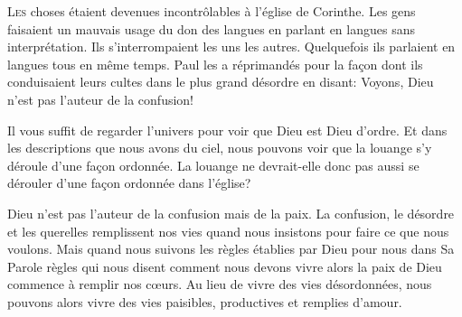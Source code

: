 \dvrule







\lettrine{L}{es} choses étaient devenues incontrôlables
 à l'église de Corinthe.
 Les gens faisaient un mauvais usage du don des langues
 en parlant en langues sans interprétation.
 Ils s'interrompaient les uns les autres.
 Quelquefois ils parlaient en langues tous en même temps.
 Paul les a réprimandés pour la fa\c{c}on dont ils conduisaient
 leurs cultes dans le plus grand désordre en disant: 
 \Og Voyons, Dieu n'est pas l'auteur de la confusion! \Fg{}

Il vous suffit de regarder l'univers
 pour voir que Dieu est Dieu d'ordre.
 Et dans les descriptions que nous avons du ciel,
 nous pouvons voir que la louange s'y déroule d'une fa\c{c}on ordonnée.
 La louange ne devrait-elle donc pas aussi se dérouler
 d'une fa\c{c}on ordonnée dans l'église?


Dieu n'est pas l'auteur de la confusion mais de la paix.
 La confusion, le désordre et les querelles remplissent nos vies
 quand nous insistons pour faire ce que nous voulons.
 Mais quand nous suivons les règles établies par Dieu pour nous dans Sa Parole
 \ocadr règles qui nous disent comment nous devons vivre \fcadr{}
 alors la paix de Dieu commence à remplir nos c\oe{}urs.
 Au lieu de vivre des vies désordonnées,
 nous pouvons alors vivre des vies paisibles,
 productives et remplies d'amour.

